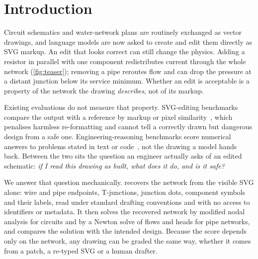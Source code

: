 \section{Introduction}
\label{sec:intro}

Circuit schematics and water-network plans are routinely exchanged as vector drawings, and language models
are now asked to create and edit them directly as SVG markup. An edit that looks correct can still change the
physics. Adding a resistor in parallel with one component redistributes current through the whole network
(\cref{fig:teaser}); removing a pipe reroutes flow and can drop the pressure at a distant junction below its
service minimum. Whether an edit is acceptable is a property of the network the drawing \emph{describes},
not of its markup.

Existing evaluations do not measure that property. SVG-editing benchmarks compare the output with a
reference by markup or pixel similarity~\cite{svgeditbench,scidiagramedit}, which penalises harmless
re-formatting and cannot tell a correctly drawn but dangerous design from a safe one. Engineering-reasoning
benchmarks score numerical answers to problems stated in text or
code~\cite{feabench,fem_bench,pdeagent_bench}, not the drawing a model hands back. Between the two sits the
question an engineer actually asks of an edited schematic: \emph{if I read this drawing as built, what does it
do, and is it safe?}

We answer that question mechanically. \ours recovers the network from the visible SVG alone: wire and pipe
endpoints, T-junctions, junction dots, component symbols and their labels, read under standard drafting
conventions and with no access to identifiers or metadata. It then solves the recovered network by modified
nodal analysis for circuits and by a Newton solve of flows and heads for pipe networks, and compares the
solution with the intended design. Because the score depends only on the network, any drawing can be graded
the same way, whether it comes from a patch, a re-typed SVG or a human drafter.

